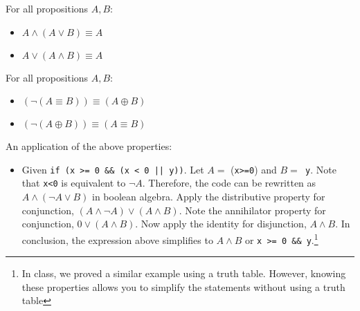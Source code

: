 \bigskip
\begin{proposition}
    For all propositions \(A,B\):
    \begin{itemize}
        \item \(A\land(A\lor B)\equiv A\)
        \item \(A\lor(A\land B)\equiv A\)
    \end{itemize}
\end{proposition}

\bigskip
\begin{proposition}
    For all propositions \(A,B\):
    \begin{itemize}
        \item \((\lnot(A\equiv B))\equiv (A\oplus B)\)
        \item \((\lnot(A\oplus B))\equiv (A\equiv B)\)
    \end{itemize}    
\end{proposition}

\bigskip
An application of the above properties:
\begin{itemize}
    \item Given \texttt{if (x >= 0 \&\& (x < 0 || y))}. Let \(A=\) (\texttt{x>=0}) and \(B=\)\texttt{ y}. Note that \texttt{x<0} is equivalent to \(\lnot A\).
    Therefore, the code can be rewritten as \(A\land(\lnot A\lor B)\) in boolean algebra. Apply the distributive property for conjunction,
    \((A\land\lnot A)\lor(A\land B)\). Note the annihilator property for conjunction, \(0\lor(A\land B)\). Now apply the identity for disjunction,
    \(A\land B\). In conclusion, the expression above simplifies to \(A\land B\) or \texttt{x >= 0 \&\& y}.\footnote{In class, we proved a similar example
    using a truth table. However, knowing these properties allows you to simplify the statements without using a truth table}
\end{itemize}